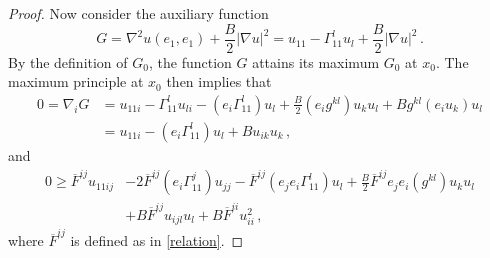 \documentclass{article}
\theoremstyle{plain}
\theoremstyle{definition}
\theoremstyle{definition}
\numberwithin{equation}{section}
\begin{document}
\begin{sloppypar}
\begin{proof}
Now consider the auxiliary function
\[
G=\nabla^2u(e_1,e_1)+\frac{B}{2}|\nabla u|^2=u_{11}-\Gamma_{11}^{l}u_{l}+\frac{B}{2}|\nabla u|^2\,.
\]
By the definition of $G_0$, the function $G$ attains its maximum $G_0$ at $x_0$.
The maximum principle  at $x_0$ then implies that
\begin{equation}\label{vanishes 1}
\begin{split}
0=\nabla_{i}G &= u_{11i}-\Gamma_{11}^{l}u_{li}-(e_{i}\Gamma_{11}^{l})u_{l}+\frac{B}{2}(e_{i}g^{kl})u_{k}u_{l}+Bg^{kl}(e_{i}u_{k})u_{l}\\
&=u_{11i}-(e_{i}\Gamma_{11}^{l})u_{l}+Bu_{ik}u_{k}\,,
\end{split}
\end{equation}
and
\begin{equation}\label{max principle}
\begin{split}
0\geq \overline{F}^{ij} u_{11ij}&-2\overline{F}^{ij}(e_{i}\Gamma_{11}^{j})u_{jj}-\overline{F}^{ij}(e_{j}e_{i}\Gamma_{11}^{l})u_{l}+\frac{B}{2}\overline{F}^{ij}e_{j}e_{i}(g^{kl})u_{k}u_{l}\\&+B\overline{F}^{ij}u_{ijl}u_{l}+B\overline{F}^{ii}u_{ii}^{2}\,,
\end{split}
\end{equation}
where ${\overline{F}^{ij}}$ is defined as in \eqref{relation}.


\end{proof}
\end{sloppypar}
\end{document}
